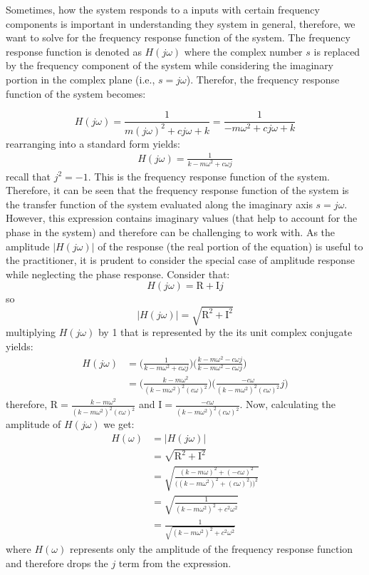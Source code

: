 \documentclass[12pt,letter]{article}
\begin{document}
Sometimes, how the system responds to a inputs with certain frequency components is important in understanding they system in general, therefore, we want to solve for the frequency response function of the system. The frequency response function is denoted as $H(j\omega)$ where the complex number $s$ is replaced by the frequency component of the system while considering the imaginary portion in the complex plane (i.e., $s = j\omega$). Therefor, the frequency response function of the system becomes:

\begin{equation}
H(j\omega) = \frac{1}{m(j\omega)^2+cj\omega+k} = \frac{1}{-m\omega^2+cj\omega+k} 
\end{equation}
rearranging into a standard form yields:
\begin{eqnarray}
H(j\omega) = \frac{1}{k-m\omega^2+c\omega j}
\label{eq:frequency_response_function}
\end{eqnarray}
recall that $j^2=-1$. This is the frequency response function of the system. Therefore, it can be seen that the frequency response function of the system is the transfer function of the system evaluated along the imaginary axis $s=j\omega$. However, this expression contains imaginary values (that help to account for the phase in the system) and therefore can be challenging to work with. As the amplitude $|H(j\omega)|$ of the response (the real portion of the equation) is useful to the practitioner, it is prudent to consider the special case of amplitude response while neglecting the phase response. Consider that:
\begin{equation}
	H(j\omega) = \text{R}+\text{I}j
\end{equation}  
so
\begin{equation}
	 |H(j\omega)|=\sqrt{\text{R}^2+\text{I}^2}
\end{equation}  
multiplying $H(j\omega)$ by 1 that is represented by the its unit complex conjugate yields:
\begin{align}
H(j\omega) &= \bigg( \frac{1}{k-m\omega^2+c\omega j} \bigg) \bigg( \frac{k-m\omega^2-c\omega j}{k-m\omega^2-c\omega j}\bigg)  \\
&= \bigg( \frac{k-m\omega^2}{(k-m\omega^2)^2(c\omega)^2} \bigg) \bigg( \frac{-c\omega}{(k-m\omega^2)^2(c\omega)^2}j\bigg)  \nonumber
\end{align}
therefore, $\text{R} = \frac{k-m\omega^2}{(k-m\omega^2)^2(c\omega)^2} $ and $\text{I} = \frac{-c\omega}{(k-m\omega^2)^2(c\omega)^2}$. Now, calculating the amplitude of $H(j\omega)$ we get:
\begin{align}
H(\omega) &= |H(j\omega)|  \\
&=  \sqrt{\text{R}^2+\text{I}^2} \nonumber  \\
&=  \sqrt{\frac{(k-m\omega)^2+(-c\omega)^2}{\big((k-m\omega^2)^2+(c\omega)^2)\big)^2}}  \nonumber \\
&=  \sqrt{\frac{1}{(k-m\omega^2)^2+c^2\omega^2}}  \nonumber \\
&= \frac{1}{\sqrt{(k-m\omega^2)^2+c^2\omega^2}}  \nonumber
\end{align}
where $H(\omega)$ represents only the amplitude of the frequency response function and therefore drops the $j$ term from the expression. 
\end{document}
